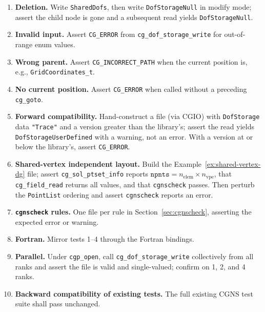 \documentclass[11pt,letterpaper]{article}
\begin{document}
\begin{enumerate}[leftmargin=2em]
\item \textbf{Deletion.}  Write \texttt{SharedDofs}, then write
  \texttt{DofStorageNull} in modify mode; assert the child node is
  gone and a subsequent read yields \texttt{DofStorageNull}.

\item \textbf{Invalid input.}  Assert \texttt{CG\_ERROR} from
  \texttt{cg\_dof\_storage\_write} for out-of-range enum values.

\item \textbf{Wrong parent.}  Assert \texttt{CG\_INCORRECT\_PATH} when
  the current position is, e.g., \texttt{GridCoordinates\_t}.

\item \textbf{No current position.}  Assert \texttt{CG\_ERROR} when
  called without a preceding \texttt{cg\_goto}.

\item \textbf{Forward compatibility.}  Hand-construct a file
  (via CGIO) with \texttt{DofStorage} data \texttt{"Trace"} and a
  version greater than the library's; assert the read yields
  \texttt{DofStorageUserDefined} with a warning, not an error.  With a
  version at or below the library's, assert \texttt{CG\_ERROR}.

\item \textbf{Shared-vertex independent layout.}  Build the
  Example~\ref{ex:shared-vertex-dg} file; assert
  \texttt{cg\_sol\_ptset\_info} reports
  $\texttt{npnts} = n_{\mathrm{elem}} \times n_{\mathrm{vpe}}$, that
  \texttt{cg\_field\_read} returns all values, and that
  \texttt{cgnscheck} passes.  Then perturb the \texttt{PointList}
  ordering and assert \texttt{cgnscheck} reports an error.

\item \textbf{\texttt{cgnscheck} rules.}  One file per rule in
  Section~\ref{sec:cgnscheck}, asserting the expected error or
  warning.

\item \textbf{Fortran.}  Mirror tests 1--4 through the Fortran
  bindings.

\item \textbf{Parallel.}  Under \texttt{cgp\_open}, call
  \texttt{cg\_dof\_storage\_write} collectively from all ranks and
  assert the file is valid and single-valued; confirm on 1, 2, and 4
  ranks.

\item \textbf{Backward compatibility of existing tests.}  The full
  existing CGNS test suite shall pass unchanged.
\end{enumerate}
\end{document}
